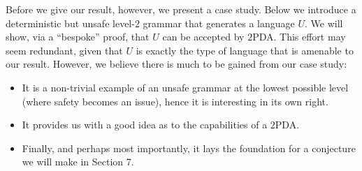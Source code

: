 Before we give our result, however, we present a case study. Below
we introduce a deterministic but unsafe level-$2$ grammar that
generates a language $U$. We will show, via a ``bespoke'' proof,
that $U$ can be accepted by $2$PDA. This effort may seem redundant,
given that $U$ is exactly the type of language that is amenable to
our result. However, we believe there is much to be gained from
our case study:
\begin{itemize}
\item It is a non-trivial example of an unsafe grammar at the
lowest possible level (where safety becomes an issue), hence it is
interesting in its own right. \item It provides us with a good
idea as to the capabilities of a $2$PDA. \item Finally, and
perhaps most importantly, it lays the foundation for a conjecture
we will make in Section 7.
\end{itemize}

%
%


